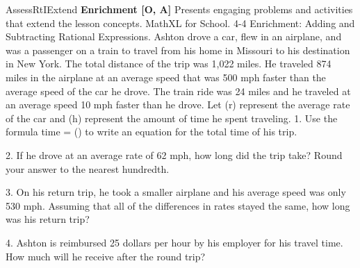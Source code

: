 \documentclass{article}
\newenvironment{te-addendum}[2]{}{}     %
\newcommand{\answer}[1]{}               %
\begin{document}
\begin{te-addendum}{Assess}{RtIExtend}
\textbf{Enrichment [O, A]}
Presents engaging problems and activities that extend the lesson concepts.
MathXL for School. 4-4 Enrichment: Adding and Subtracting Rational Expressions.
Ashton drove a car, flew in an airplane, and was a passenger on a train to travel from his home in Missouri to his destination in New York. The total distance of the trip was 1,022 miles.
He traveled 874 miles in the airplane at an average speed that was 500 mph faster than the average speed of the car he drove. The train ride was 24 miles and he traveled at an average speed 10 mph faster than he drove.
Let (r) represent the average rate of the car and (h) represent the amount of time he spent traveling.
1. Use the formula time = () to write an equation for the total time of his trip.
\answer{(h=\frac{1022r^2+83980r+620000}{r(r^2+510r+5000)})}
2. If he drove at an average rate of 62 mph, how long did the trip take? Round your answer to the nearest hundredth.
\answer{3.89 hours}
3. On his return trip, he took a smaller airplane and his average speed was only 530 mph. Assuming that all of the differences in rates stayed the same, how long was his return trip?
\answer{6.38 hours}
4. Ashton is reimbursed 25 dollars per hour by his employer for his travel time. How much will he receive after the round trip?
\answer{\$256.75}
\end{te-addendum}
\end{document}
